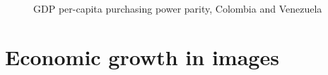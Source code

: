 \documentclass[
  ignorenonframetext,
]{beamer}
\begin{document}
\begin{frame}{}
\label{section-6}
\begin{figure}


\caption{\label{fig-growth-paths-col-ven}GDP per-capita purchasing power
parity, Colombia and Venezuela}

\end{figure}%
\end{frame}

\section{Economic growth in images}\label{economic-growth-in-images}
\end{document}
